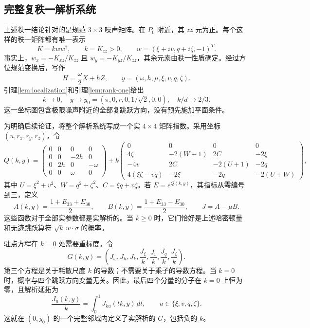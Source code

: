 \documentclass[UTF8,11pt,a4paper,fontset=fandol]{ctexart}
\theoremstyle{definition}
\theoremstyle{remark}
\begin{document}
\subsection{完整复秩一解析系统}
上述秩一结论针对的是规范 \(3\times3\) 噪声矩阵。在 \(P_0\) 附近，其 \(zz\) 元为正。每个这样的秩一矩阵都有唯一表示
\begin{equation}\label{eq:rank-one-chart}
 K=kww^\dagger,\qquad k=K_{zz}>0,\qquad
 w=(\xi+iv,q+i\zeta,-1)^T.
\end{equation}
事实上，\(w_x=-K_{xz}/K_{zz}\) 且 \(w_y=-K_{yz}/K_{zz}\)，其余元素由秩一性质确定。经过方位规范变换后，写作
\[
 H=\frac\omega2X+hZ,
 \qquad y=(\omega,h,\mu,\xi,v,q,\zeta).
\]
引理\ref{lem:localization}和引理\ref{lem:rank-one}给出
\begin{equation}\label{eq:chart-base}
 k\longrightarrow0,\quad
 y\longrightarrow y_0=(\pi,0,r,0,1/\sqrt2,0,0),\quad
 k/d\longrightarrow2/3.
\end{equation}
这一坐标图包含极限噪声附近的全部复跳跃方向，没有预先施加平面条件。

为明确后续论证，将整个解析系统写成一个实 \(4\times4\) 矩阵指数。采用坐标 \((u,r_x,r_y,r_z)\)，令
\begin{equation}\label{eq:augmented-Q}
 Q(k,y)=
 \begin{pmatrix}0&0&0&0\\0&0&-2h&0\\0&2h&0&-\omega\\0&0&\omega&0\end{pmatrix}
 +k\begin{pmatrix}
 0&0&0&0\\
 4\zeta&-2(W+1)&2C&-2\xi\\
 -4v&2C&-2(U+1)&-2q\\
 4(\xi\zeta-vq)&-2\xi&-2q&-2(U+W)
 \end{pmatrix},
\end{equation}
其中 \(U=\xi^2+v^2\)、\(W=q^2+\zeta^2\)、\(C=\xi q+v\zeta\)。若 \(E=e^{Q(k,y)}\)，其指标从零编号到三，定义
\begin{equation}\label{eq:analytic-probabilities}
 A(k,y)=\frac{1+E_{33}+E_{30}}2,\qquad
 B(k,y)=\frac{1+E_{33}-E_{30}}2,\qquad J=A-\mu B.
\end{equation}
这些函数对于全部实参数都是实解析的。当 \(k\geq0\) 时，它们恰好是上述哈密顿量和无迹跳跃算符 \(\sqrt{k}\,w\cdot\sigma\) 的概率。

驻点方程在 \(k=0\) 处需要重标度。令
\begin{equation}\label{eq:stationary-system}
 G(k,y)=\left(J_\omega,J_h,J_k,
 \frac{J_\xi}{k},\frac{J_v}{k},\frac{J_q}{k},\frac{J_\zeta}{k}\right).
\end{equation}
第三个方程是关于耗散尺度 \(k\) 的导数；不需要关于乘子的导数方程。当 \(k=0\) 时，概率与四个跳跃方向变量无关。因此，最后四个分量的分子在 \(k=0\) 上恒为零，且解析延拓为
\begin{equation}\label{eq:analytic-division}
 \frac{J_u(k,y)}k=\int_0^1J_{ku}(tk,y)\,dt,
 \qquad u\in\{\xi,v,q,\zeta\}.
\end{equation}
这就在 \((0,y_0)\) 的一个完整邻域内定义了实解析的 \(G\)，包括负的 \(k\)。
\end{document}
